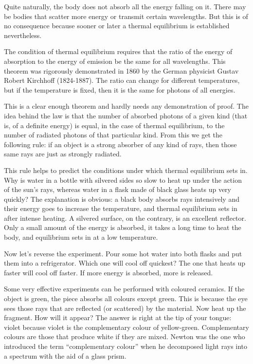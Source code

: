 Quite naturally, the body does not absorb all the energy falling on it. There may be bodies that scatter more energy or transmit certain wavelengths. But this is of no consequence because sooner or later a thermal equilibrium is established nevertheless.

The condition of thermal equilibrium requires that the ratio of the energy of absorption to the energy of emission be the same for all wavelengths. This theorem was rigorously demonstrated in 1860 by the German physicist Gustav Robert Kirchhoff (1824-1887). The ratio can change for different temperatures, but if the temperature is fixed, then it is the same for photons of all energies.

This is a clear enough theorem and hardly needs any demonstration of proof. The idea behind the law is that the number of absorbed photons of a given kind (that is, of a definite energy) is equal, in the case of thermal equilibrium, to the number of radiated photons of that particular kind. From this we get the following rule: if an object is a strong absorber of any kind of rays, then those same rays are just as strongly radiated.

This rule helps to predict the conditions under which thermal equilibrium sets in. Why is water in a bottle with silvered sides so slow to heat up under the action of the sun's rays, whereas water in a flask made of black glass heats up very quickly? The explanation is obvious: a black body absorbs rays intensively and their energy goes to increase the temperature, and thermal equilibrium sets in after intense heating. A silvered surface, on the contrary, is an excellent reflector. Only a small amount of the energy is absorbed, it takes a long time to heat the body, and equilibrium sets in at a low temperature.

Now let’s reverse the experiment. Pour some hot water into both flasks and put them into a refrigerator. Which one will cool off quickest? The one that heats up faster will cool off faster. If more energy is absorbed, more is released.

Some very effective experiments can be performed with coloured ceramics. If the object is green, the piece absorbs all colours except green. This is because the eye sees those rays that are reflected (or scattered) by the material. Now heat up the fragment. How will it appear? The answer is right at the tip of your tongue: violet because violet is the complementary colour of yellow-green. Complementary colours are those that produce white if they are mixed. Newton was the one who introduced the term ``complementary colour'' when he decomposed light rays into a spectrum with the aid of a glass prism.

